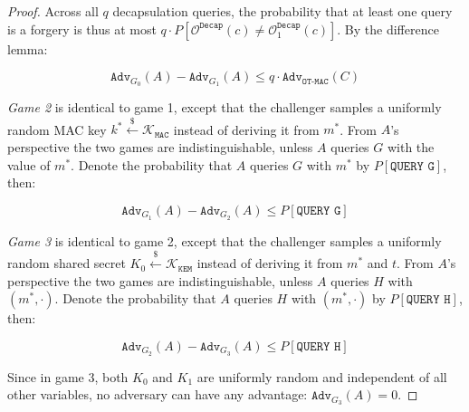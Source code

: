 \documentclass[journal=tches,submission]{iacrtrans}
\newcommand{\kem}{\texttt{KEM}}
\newcommand{\decap}{\texttt{Decap}}
\newcommand{\mac}{\texttt{MAC}}
\newcommand{\leftsample}{\stackrel{\$}{\leftarrow}}
\newcommand{\adv}{\texttt{Adv}}
\begin{document}
\begin{proof}
    Across all $q$ decapsulation queries, the probability that at least one query is a forgery is thus at most $q \cdot P\left[\mathcal{O}^\decap(c) \neq \mathcal{O}^\decap_1(c)\right]$. By the difference lemma:

    \begin{equation*}
        \adv_{G_0}(A) - \adv_{G_1}(A) \leq q\cdot  \adv_\texttt{OT-MAC}(C)
    \end{equation*}

    \emph{Game 2} is identical to game 1, except that the challenger samples a uniformly random MAC key $k^\ast \leftsample \mathcal{K}_\mac$ instead of deriving it from $m^\ast$. From $A$'s perspective the two games are indistinguishable, unless $A$ queries $G$ with the value of $m^\ast$. Denote the probability that $A$ queries $G$ with $m^\ast$ by $P[\texttt{QUERY G}]$, then:

    \begin{equation*}
        \adv_{G_1}(A) - \adv_{G_2}(A) \leq P\left[\texttt{QUERY G}\right]
    \end{equation*}

    \emph{Game 3} is identical to game 2, except that the challenger samples a uniformly random shared secret $K_0 \leftsample \mathcal{K}_\kem$ instead of deriving it from $m^\ast$ and $t$. From $A$'s perspective the two games are indistinguishable, unless $A$ queries $H$ with $(m^\ast, \cdot)$. Denote the probability that $A$ queries $H$ with $(m^\ast, \cdot)$ by $P[\texttt{QUERY H}]$, then:

    \begin{equation*}
        \adv_{G_2}(A) - \adv_{G_3}(A) \leq P\left[\texttt{QUERY H}\right]
    \end{equation*}

    Since in game 3, both $K_0$ and $K_1$ are uniformly random and independent of all other variables, no adversary can have any advantage: $\adv_{G_3}(A) = 0$.


\end{proof}
\end{document}
